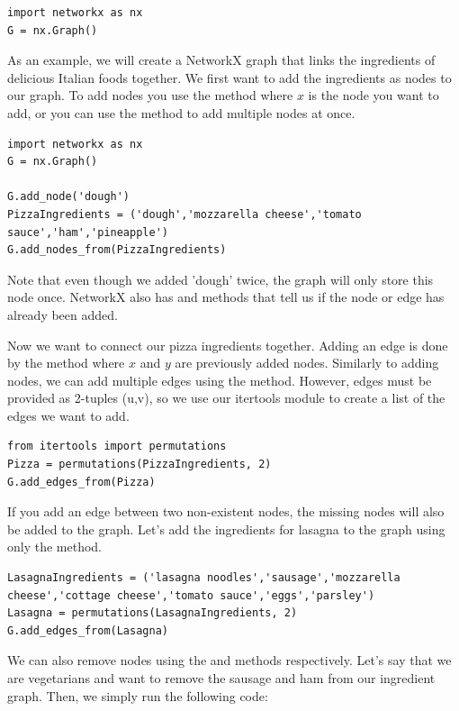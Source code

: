 \begin{lstlisting}
import networkx as nx
G = nx.Graph()
\end{lstlisting}

As an example, we will create a NetworkX graph that links the ingredients of delicious Italian foods together. We first want to add the ingredients as nodes to our graph. To add nodes you use the  method where $x$ is the node you want to add, or you can use the  method to add multiple nodes at once.

\begin{lstlisting}
import networkx as nx
G = nx.Graph()

G.add_node('dough')
PizzaIngredients = ('dough','mozzarella cheese','tomato sauce','ham','pineapple')
G.add_nodes_from(PizzaIngredients)
\end{lstlisting}
Note that even though we added 'dough' twice, the graph will only store this node once. NetworkX also has  and  methods that tell us if the node or edge has already been added.

Now we want to connect our pizza ingredients together. Adding an edge is done by the  method where $x$ and $y$ are previously added nodes. Similarly to adding nodes, we can add multiple edges using the  method. However, edges must be provided as 2-tuples (u,v), so we use our itertools module to create a list of the edges we want to add.

\begin{lstlisting}
from itertools import permutations
Pizza = permutations(PizzaIngredients, 2)
G.add_edges_from(Pizza)
\end{lstlisting}

If you add an edge between two non-existent nodes, the missing nodes will also be added to the graph. Let's add the ingredients for lasagna to the graph using only the  method.

\begin{lstlisting}
LasagnaIngredients = ('lasagna noodles','sausage','mozzarella cheese','cottage cheese','tomato sauce','eggs','parsley')
Lasagna = permutations(LasagnaIngredients, 2)
G.add_edges_from(Lasagna)
\end{lstlisting}

We can also remove nodes using the  and  methods respectively. Let's say that we are vegetarians and want to remove the sausage and ham from our ingredient graph. Then, we simply run the following code:

